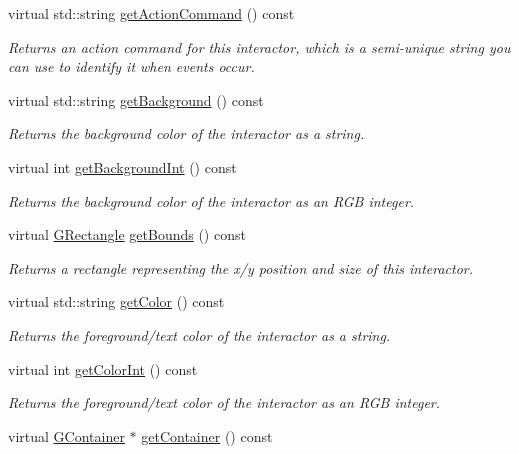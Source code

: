 \begin{DoxyCompactItemize}
virtual std\+::string \mbox{\hyperlink{classGInteractor_a94eb4276000c4fdfb508ce9e6317a82a}{get\+Action\+Command}} () const
\begin{DoxyCompactList}\small\item\em Returns an action command for this interactor, which is a semi-\/unique string you can use to identify it when events occur. \end{DoxyCompactList}\item 
virtual std\+::string \mbox{\hyperlink{classGInteractor_a808e22cc1fdfbecf71ed8c64ef4600e0}{get\+Background}} () const
\begin{DoxyCompactList}\small\item\em Returns the background color of the interactor as a string. \end{DoxyCompactList}\item 
virtual int \mbox{\hyperlink{classGInteractor_a9e827257a55cb8cf4d9de2ec6bcfd7a0}{get\+Background\+Int}} () const
\begin{DoxyCompactList}\small\item\em Returns the background color of the interactor as an R\+GB integer. \end{DoxyCompactList}\item 
virtual \mbox{\hyperlink{structGRectangle}{G\+Rectangle}} \mbox{\hyperlink{classGInteractor_a29e6ac35a0b48f491a4c88194cc5da3b}{get\+Bounds}} () const
\begin{DoxyCompactList}\small\item\em Returns a rectangle representing the x/y position and size of this interactor. \end{DoxyCompactList}\item 
virtual std\+::string \mbox{\hyperlink{classGInteractor_aa061dfa488c31e18549d64363c1d0e34}{get\+Color}} () const
\begin{DoxyCompactList}\small\item\em Returns the foreground/text color of the interactor as a string. \end{DoxyCompactList}\item 
virtual int \mbox{\hyperlink{classGInteractor_a9635c7af766cdc3417f346683fa0e6c1}{get\+Color\+Int}} () const
\begin{DoxyCompactList}\small\item\em Returns the foreground/text color of the interactor as an R\+GB integer. \end{DoxyCompactList}\item 
virtual \mbox{\hyperlink{classGContainer}{G\+Container}} $\ast$ \mbox{\hyperlink{classGInteractor_a7a6e317c29d61030929b4cd2d1c00fe7}{get\+Container}} () const

\end{DoxyCompactItemize}
